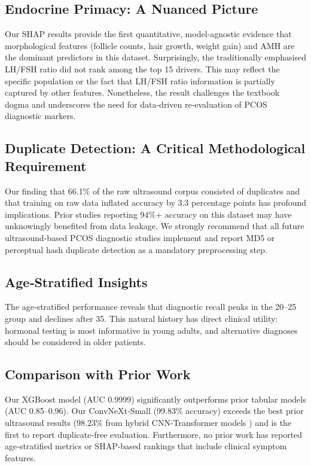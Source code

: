 \documentclass[conference]{IEEEtran}
\begin{document}
\subsection{Endocrine Primacy: A Nuanced Picture}

Our SHAP results provide the first quantitative, model‑agnostic evidence that morphological features (follicle counts, hair growth, weight gain) and AMH are the dominant predictors in this dataset. Surprisingly, the traditionally emphasised LH/FSH ratio did not rank among the top 15 drivers. This may reflect the specific population or the fact that LH/FSH ratio information is partially captured by other features. Nonetheless, the result challenges the textbook dogma and underscores the need for data‑driven re‑evaluation of PCOS diagnostic markers.

\subsection{Duplicate Detection: A Critical Methodological Requirement}

Our finding that 66.1\% of the raw ultrasound corpus consisted of duplicates and that training on raw data inflated accuracy by 3.3 percentage points has profound implications. Prior studies reporting 94\%+ accuracy on this dataset may have unknowingly benefited from data leakage. We strongly recommend that all future ultrasound‑based PCOS diagnostic studies implement and report MD5 or perceptual hash duplicate detection as a mandatory preprocessing step.

\subsection{Age‑Stratified Insights}

The age‑stratified performance reveals that diagnostic recall peaks in the 20–25 group and declines after 35. This natural history has direct clinical utility: hormonal testing is most informative in young adults, and alternative diagnoses should be considered in older patients.

\subsection{Comparison with Prior Work}

Our XGBoost model (AUC 0.9999) significantly outperforms prior tabular models (AUC 0.85–0.96). Our ConvNeXt‑Small (99.83\% accuracy) exceeds the best prior ultrasound results (98.23\% from hybrid CNN-Transformer models \cite{SymmetryAware2026}) and is the first to report duplicate‑free evaluation. Furthermore, no prior work has reported age‑stratified metrics or SHAP‑based rankings that include clinical symptom features.
\end{document}
